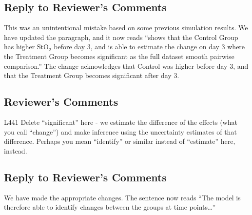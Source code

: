 \documentclass[
]{article}
\begin{document}
\hypertarget{section-35}{%
\subsection{\texorpdfstring{\textcolor{reviewersblue} {Reply to Reviewer's Comments}}{}}\label{section-35}}

This was an unintentional mistake based on some previous simulation results. We have updated the paragraph, and it now reads ``shows that the Control Group has higher \(\mbox{StO}_2\) before day 3, and is able to estimate the change on day 3 where the Treatment Group becomes significant as the full dataset smooth pairwise comparison.'' The change acknowledges that Control was higher before day 3, and that the Treatment Group becomes significant after day 3.

\hypertarget{reviewers-comments-35}{%
\subsection{Reviewer's Comments}\label{reviewers-comments-35}}

L441 Delete ``significant'' here - we estimate the difference of the effects (what you call ``change'') and make inference using the uncertainty estimates of that difference. Perhaps you mean ``identify'' or similar instead of ``estimate'' here, instead.

\hypertarget{section-36}{%
\subsection{\texorpdfstring{\textcolor{reviewersblue} {Reply to Reviewer's Comments}}{}}\label{section-36}}

We have made the appropriate changes. The sentence now reads ``The model is therefore able to identify changes between the groups at time points\ldots{}''
\end{document}
